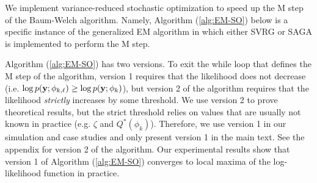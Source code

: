 We implement variance-reduced stochastic optimization to speed up the M step of the Baum-Welch algorithm. Namely, Algorithm (\ref{alg:EM-SO}) below is a specific instance of the generalized EM algorithm \citep{Dempster:1977} in which either SVRG or SAGA is implemented to perform the M step. 




Algorithm (\ref{alg:EM-SO}) has two versions. To exit the while loop that defines the M step of the algorithm, version 1 requires that the likelihood does not decrease (i.e. $\log p(\mathbf{y};\phi_{k,\ell}) \geq \log p(\mathbf{y};\phi_{k})$), but version 2 of the algorithm requires that the likelihood \textit{strictly} increases by some threshold. We use version 2 to prove theoretical results, but the strict threshold relies on values that are usually not known in practice (e.g. $\zeta$ and $Q^*(\phi_{k})$). Therefore, we use version 1 in our simulation and case studies and only present version 1 in the main text. See the appendix for version 2 of the algorithm. Our experimental results show that version 1 of Algorithm (\ref{alg:EM-SO}) converges to local maxima of the log-likelihood function in practice. 

